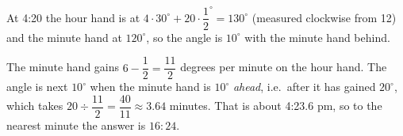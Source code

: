 At 4:20 the hour hand is at $4\cdot30^\circ+20\cdot\dfrac{1}{2}^\circ=130^\circ$ (measured clockwise from 12) and the minute hand at $120^\circ$, so the angle is $10^\circ$ with the minute hand behind.

The minute hand gains $6-\dfrac{1}{2}=\dfrac{11}{2}$ degrees per minute on the hour hand. The angle is next $10^\circ$ when the minute hand is $10^\circ$ \emph{ahead}, i.e.\ after it has gained $20^\circ$, which takes $20\div\dfrac{11}{2}=\dfrac{40}{11}\approx3.64$ minutes. That is about 4:23.6 pm, so to the nearest minute the answer is $\boxed{16{:}24}$.
